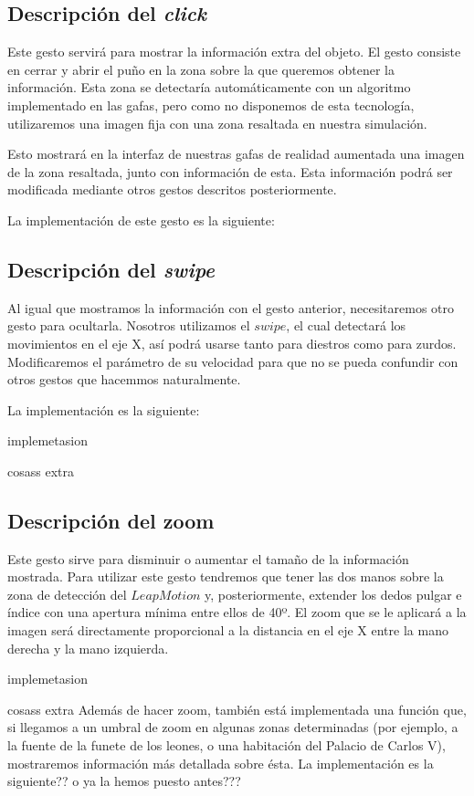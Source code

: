 \documentclass[11pt,a4paper]{article}
\begin{document}
\subsection{Descripción del \textit{click}}
Este gesto servirá para mostrar la información extra del objeto. El gesto consiste en cerrar y abrir el puño en la zona sobre la que
queremos obtener la información. Esta zona se detectaría automáticamente con un algoritmo implementado en las gafas, pero como no disponemos
de esta tecnología, utilizaremos una imagen fija con una zona resaltada en nuestra simulación.

Esto mostrará en la interfaz de nuestras gafas de realidad aumentada una imagen de la zona resaltada, junto con información de esta. Esta
información podrá ser modificada mediante otros gestos descritos posteriormente.

La implementación de este gesto es la siguiente:





\subsection{Descripción del \textit{swipe}}
Al igual que mostramos la información con el gesto anterior, necesitaremos otro gesto para ocultarla. Nosotros utilizamos el $swipe$, el cual
detectará los movimientos en el eje X, así podrá usarse tanto para diestros como para zurdos. Modificaremos el parámetro de su velocidad
para que no se pueda confundir con otros gestos que hacemmos naturalmente.

La implementación es la siguiente:

implemetasion

cosass extra


\subsection{Descripción del zoom}
Este gesto sirve para disminuir o aumentar el tamaño de la información mostrada. Para utilizar este gesto tendremos que tener las dos manos
sobre la zona de detección del $Leap Motion$ y, posteriormente, extender los dedos pulgar e índice con una apertura mínima entre ellos de 40º.
El zoom que se le aplicará a la imagen será directamente proporcional a la distancia en el eje X entre la mano derecha y la mano izquierda.

implemetasion



cosass extra
Además de hacer zoom, también está implementada una función que, si llegamos a un umbral de zoom en algunas zonas determinadas (por ejemplo,
a la fuente de la funete de los leones, o una habitación del Palacio de Carlos V), mostraremos información más detallada sobre ésta. La
implementación es la siguiente?? o ya la hemos puesto antes???
\end{document}

